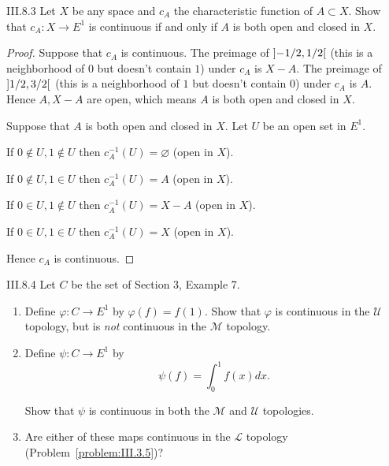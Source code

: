 \begin{problem}{III.8.3}
Let \(X\) be any space and \(c_{A}\) the characteristic function of \(A \subset X\). Show that \( c_{A}: X \to E^{1} \) is continuous if and only if \(A\) is both open and closed in \(X\).
\end{problem}

\begin{proof}
    Suppose that \( c_{A} \) is continuous. The preimage of \( \left\rbrack{-1/2, 1/2}\right\lbrack \) (this is a neighborhood of \(0\) but doesn't contain \(1\)) under \( c_{A} \) is \( X - A \). The preimage of \( \left\rbrack{1/2, 3/2}\right\lbrack \) (this is a neighborhood of \(1\) but doesn't contain \(0\)) under \( c_{A} \) is \( A \). Hence \( A, X - A \) are open, which means \(A\) is both open and closed in \(X\).

    Suppose that \( A \) is both open and closed in \(X\). Let \( U \) be an open set in \( E^{1} \).

    If \( 0 \notin U, 1 \notin U \) then \( c_{A}^{-1}(U) = \varnothing \) (open in \(X\)).

    If \( 0 \notin U, 1 \in U \) then \( c_{A}^{-1}(U) = A \) (open in \(X\)).

    If \( 0 \in U, 1 \notin U \) then \( c_{A}^{-1}(U) = X - A \) (open in \(X\)).

    If \( 0 \in U, 1 \in U \) then \( c_{A}^{-1}(U) = X \) (open in \(X\)).

    Hence \( c_{A} \) is continuous.
\end{proof}

\begin{problem}{III.8.4}
Let \(C\) be the set of Section 3, Example 7.
\begin{enumerate}[label={(\alph*)}]
    \item Define \( \varphi: C \to E^{1} \) by \( \varphi(f) = f(1) \). Show that \( \varphi \) is continuous in the \( \mathscr{U} \) topology, but is \textit{not} continuous in the \( \mathscr{M} \) topology.
    \item Define \( \psi: C \to E^{1} \) by
          \[
              \psi(f) = \int_{0}^{1} f(x) dx.
          \]

          Show that \(\psi\) is continuous in both the \(\mathscr{M}\) and \(\mathscr{U}\) topologies.
    \item Are either of these maps continuous in the \( \mathscr{L} \) topology (Problem~\ref{problem:III.3.5})?
\end{enumerate}
\end{problem}

